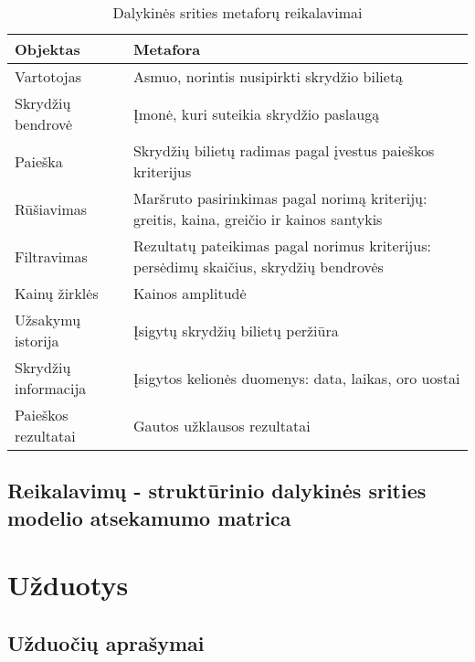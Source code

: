 \documentclass{VUMIFPSkursinis}
\begin{document}
            \begin{table}[H]\footnotesize
            \centering
            \caption{Dalykinės srities metaforų reikalavimai}
                {\begin{tabular}{|l|l|} \hline
                    Objektas & Metafora \\
                    \hline
                    \hline
                    Vartotojas  & Asmuo, norintis nusipirkti skrydžio bilietą \\
                    \hline
                    Skrydžių bendrovė  & Įmonė, kuri suteikia skrydžio paslaugą \\
                    \hline
                    Paieška & Skrydžių bilietų radimas pagal įvestus paieškos kriterijus \\
                    \hline
                    Rūšiavimas & Maršruto pasirinkimas pagal norimą kriterijų: greitis, kaina, greičio ir kainos santykis \\
                    \hline
                    Filtravimas & Rezultatų pateikimas pagal norimus kriterijus: persėdimų skaičius, skrydžių bendrovės \\
                    \hline
                    Kainų žirklės & Kainos amplitudė \\
                    \hline
                    Užsakymų istorija & Įsigytų skrydžių bilietų peržiūra \\
                    \hline
                    Skrydžių informacija & Įsigytos kelionės duomenys: data, laikas, oro uostai \\
                    \hline
                    Paieškos rezultatai & Gautos užklausos rezultatai \\
                    \hline
                \end{tabular}}
            \label{tab:table example}
            \end{table}

        \subsection{Reikalavimų - struktūrinio dalykinės srities modelio atsekamumo matrica}
  
    \section{Užduotys}
        \subsection{Užduočių aprašymai}
        
\end{document}
